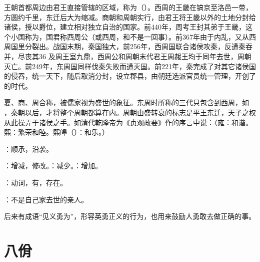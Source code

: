 {
王朝首都周边由君王直接管辖的区域，称为（）。西周的王畿在镐京至洛邑一带，方圆约千里，东迁后大为缩减。商朝和周朝实行，由君王将王畿以外的土地分封给诸侯，授以爵位，建立相对独立自治的国家。前440年，周考王封其弟于王畿，这个小国称为，国君称西周公（或西周，和不是一回事）。前367年由于内乱，又从西周国里分裂出。战国末期，秦国独大，前256年，西周国联合诸侯攻秦，反遭秦吞并，尽丧其36 及周王室九鼎，西周公和周朝末代君王周赧王均于同年去世，周朝灭亡。前249年，东周国同样伐秦失败而遭灭国。前221年，秦完成了对其它诸侯国的侵吞，统一天下，随后取消分封，设立郡县，由朝廷选派官员统一管理，开创了的时代。

夏、商、周合称，被儒家视为盛世的象征。东周时所称的三代只包含到西周，如 ，秦朝以后，才将整个周朝都算在内。周朝由盛转衰的标志是平王东迁，天子之权从此操弄于诸侯之手。如清代乾隆帝为《贞观政要》作的序言中说：（雍：和谐。熙：繁荣和睦。熙皞（）：和乐。）

\item {}：顺承，沿袭。

\item {}：增减，修改。：减少。：增加。

\item {}：动词，有，存在。
}
{}  %


{
\item {}：不是自己家去世的亲人。
\item {}后来有成语“见义勇为”，形容英勇正义的行为，也用来鼓励人勇敢去做正确的事。
}
{}



\chapter{八佾}

